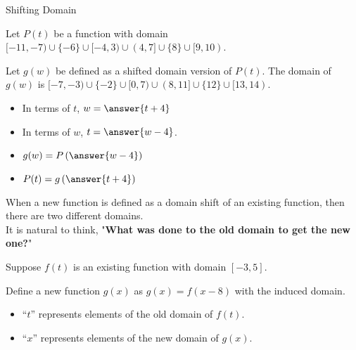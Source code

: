 \documentclass{ximera}
\begin{document}
\begin{example} Shifting Domain


Let $P(t)$ be a function with domain $[-11, -7) \cup \{ -6 \} \cup [-4,3) \cup (4, 7] \cup \{ 8 \} \cup [9, 10)$.

Let $g(w)$ be defined as a shifted domain version of $P(t)$.  The domain of $g(w)$ is $[-7, -3) \cup \{ -2 \} \cup [0,7) \cup (8, 11] \cup \{ 12 \} \cup [13, 14)$.

\begin{itemize}
\item In terms of $t$, $w = \answer{t+4}$ 
\item In terms of $w$, $t = \answer{w-4}$.  \\
\end{itemize}


\begin{itemize}
\item $g(w) = P\left(\answer{w-4}\right)$ \\

\item $P(t) = g\left(\answer{t+4}\right)$ \\
\end{itemize}

\end{example}














When a new function is defined as a domain shift of an existing function, then there are two different domains.  \\


It is natural to think, "\textbf{\textcolor{purple!85!blue}{What was done to the old domain to get the new one?}}"

Suppose $f(t)$ is an existing function with domain $[-3, 5]$.

Define a new function $g(x)$ as $g(x) = f(x-8)$ with the induced domain.



\begin{itemize}
\item ``$t$'' represents elements of the old domain of $f(t)$.  
\item ``$x$'' represents elements of the new domain of $g(x)$.  
\end{itemize}
\end{document}
